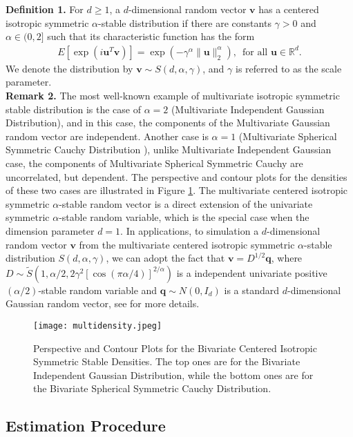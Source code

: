 \documentclass[journal,onecolumn]{IEEEtran}
\begin{document}
\noindent
{\bf Definition 1.} For $d\geq 1$, a $d$-dimensional random vector $\mathbf{v}$ has a centered isotropic symmetric $\alpha$-stable distribution if there are constants $\gamma>0$ and $\alpha\in(0,2]$ such that its characteristic function has the form \begin{align}
E[\exp(i\mathbf{u}^{T}\mathbf{v})]=\exp(-\gamma^{\alpha}\lVert\mathbf{u}\rVert_2^\alpha),\,\,\,\text{for all $\mathbf{u}\in\mathbb{R}^d$}.
\end{align}
We denote the distribution by $\mathbf{v}\sim S(d,\alpha,\gamma)$, and $\gamma$ is referred to as the scale parameter.\\

\noindent
{\bf Remark 2.} The most well-known example of multivariate isotropic symmetric stable distribution is the case of $\alpha=2$ (Multivariate Independent Gaussian Distribution), and in this case, the components of the Multivariate Gaussian random vector are independent. Another case is $\alpha=1$ (Multivariate Spherical Symmetric Cauchy Distribution \cite{p}), unlike Multivariate Independent Gaussian case, the components of Multivariate Spherical Symmetric Cauchy are uncorrelated, but dependent. The perspective and contour plots for the densities of these two cases are illustrated in Figure \ref{fig_2}. The multivariate centered isotropic symmetric $\alpha$-stable random vector is a direct extension of the univariate symmetric $\alpha$-stable random variable, which is the special case when the dimension parameter $d=1$. In applications, to simulation a $d$-dimensional random vector $\mathbf{v}$ from the multivariate centered isotropic symmetric $\alpha$-stable distribution $S(d,\alpha,\gamma)$, we can adopt the fact that $\mathbf{v}=D^{1/2}\mathbf{q}$, where $D\sim \tilde{S}(1,\alpha/2,2\gamma^2[\cos(\pi\alpha/4)]^{2/\alpha})$ is a independent univariate positive
$(\alpha/2)$-stable random variable and $\mathbf{q}\sim N(0,I_d)$ is a standard $d$-dimensional Gaussian random vector, see \cite{n} for more details.
\begin{figure}[!t]
\centering
\texttt{[image: multidensity.jpeg]}
\caption{Perspective and Contour Plots for the Bivariate Centered Isotropic Symmetric Stable Densities. The top ones are for the Bivariate Independent Gaussian Distribution, while the bottom ones are for the Bivariate Spherical Symmetric Cauchy Distribution.}
\label{fig_2}
\end{figure}

\subsection{Estimation Procedure}
\end{document}
